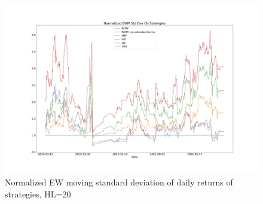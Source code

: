 \documentclass[10pt,twoside,titlepage]{article}   %
\begin{document}
\noindent
\begin{figure}[!h]
\includegraphics[width = 1.00\textwidth]{image2.jpg}
\vspace{-1.75\baselineskip}
\caption{Normalized EW moving standard deviation of daily returns of strategies, HL=20}
\label{fig2}
\end{figure}
\end{document}
